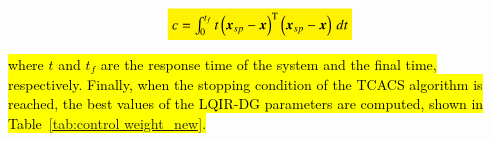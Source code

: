 \documentclass[3p]{elsarticle}
\begin{document}

\begin{equation}
    \colorbox{yellow}{$c = \int_{0}^{t_f} t \left(
        \boldsymbol{x}_{sp} - \boldsymbol{x} 
        \right)^\mathrm{T} \left(\boldsymbol{x}_{sp} - \boldsymbol{x} \right) \, dt$}
\end{equation}


\hl{
where $t$ and $t_f$ are the response time of the system and the final time, respectively. Finally, when the stopping condition of the TCACS algorithm is reached, the best values of the LQIR-DG parameters are computed, shown in Table~{\ref{tab:control weight_new}}.
}


\end{document}
